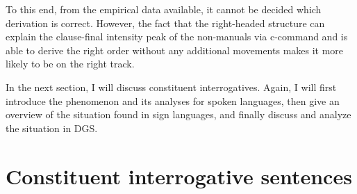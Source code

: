 %
%
%
%
%


\noindent To this end, from the empirical data available, it cannot be decided which derivation is correct. However, the fact that the right-headed structure can explain the clause-final intensity peak of the non-manuals via c-command and is able to derive the right order without any additional movements makes it more likely to be on the right track. %

In the next section, I will discuss constituent interrogatives. Again, I will first introduce the phenomenon and its analyses for spoken languages, then give an overview of the situation found in sign languages, and finally discuss and analyze the situation in DGS.



\section{Constituent interrogative sentences}\label{constint}


